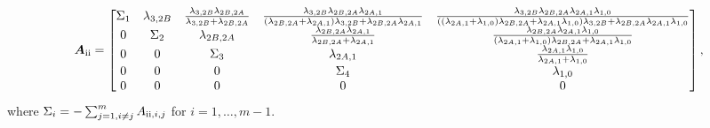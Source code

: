 \documentclass{article}
\newcommand{\RN}[1]{\textup{\uppercase\expandafter{\romannumeral#1}}}
\begin{document}
\begin{align*}
  \bm{A}_{\RN{2}}=\begin{bmatrix}
\Sigma_1 %
 & \lambda_{3,2B} & \frac{\lambda_{3,2B} \lambda_{2B,2A}}{\lambda_{3,2B}+\lambda_{2B,2A}} & \frac{\lambda_{3,2B} \lambda_{2B,2A} \lambda_{2A,1}}{\left(\lambda_{2B,2A}+\lambda_{2A,1}\right) \lambda_{3,2B}+\lambda_{2B,2A} \lambda_{2A,1}} & \frac{\lambda_{3,2B} \lambda_{2B,2A} \lambda_{2A,1} \lambda_{1,0}}{\left(\left(\lambda_{2A,1}+\lambda_{1,0}\right) \lambda_{2B,2A}+\lambda_{2A,1} \lambda_{1,0}\right) \lambda_{3,2B}+\lambda_{2B,2A} \lambda_{2A,1} \lambda_{1,0}} 
\\
 0 & 
 \Sigma_2 %
 & \lambda_{2B,2A} & \frac{\lambda_{2B,2A} \lambda_{2A,1}}{\lambda_{2B,2A}+\lambda_{2A,1}} & \frac{\lambda_{2B,2A} \lambda_{2A,1} \lambda_{1,0}}{\left(\lambda_{2A,1}+\lambda_{1,0}\right) \lambda_{2B,2A}+\lambda_{2A,1} \lambda_{1,0}} 
\\
 0 & 0 & %
 \Sigma_3 & \lambda_{2A,1} & \frac{\lambda_{2A,1} \lambda_{1,0}}{\lambda_{2A,1}+\lambda_{1,0}} 
\\
 0 & 0 & 0 & %
 \Sigma_4 & \lambda_{1,0} 
\\
 0 & 0 & 0 & 0 & 0 
    \end{bmatrix},
\end{align*}
where $\Sigma_i = -\sum_{j=1, i \neq j}^m A_{\RN{2},i,j}$ for $i = 1, \dots, m-1$. 
\end{document}
